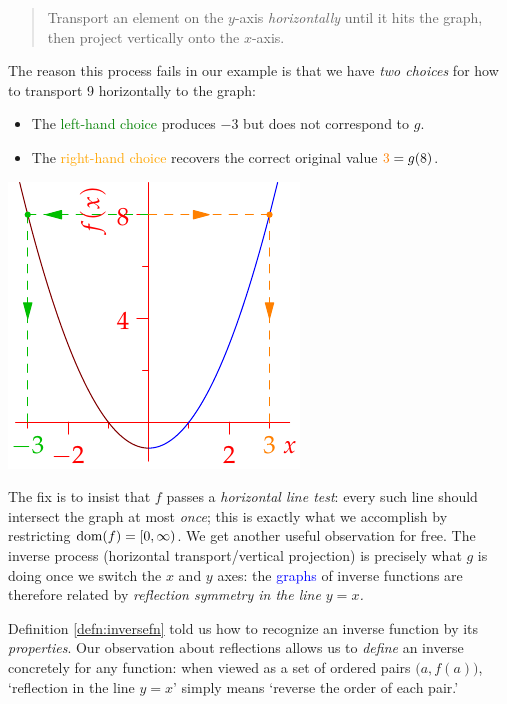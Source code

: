 \begin{minipage}[t]{0.72\linewidth}\vspace{-3pt}
\begin{quote}
Transport an element on the $y$-axis \emph{horizontally} until it hits the graph, then project vertically onto the $x$-axis.
\end{quote}
The reason this process fails in our example is that we have \emph{two choices} for how to transport 9 horizontally to the graph:
\begin{itemize}\itemsep2pt
  \item The \textcolor{Green}{left-hand choice} produces $-3$ but does not correspond to $g$.
  \item The \textcolor{orange}{right-hand choice} recovers the correct original value $\textcolor{orange}{3}=g(8)$.
\end{itemize}
\end{minipage}\hfill\begin{minipage}[t]{0.27\linewidth}\vspace{-8pt}
\flushright\includegraphics[scale=0.9]{inverses-poly1}
\end{minipage}\medbreak
The fix is to insist that $f$ passes a \emph{horizontal line test}: every such line should intersect the graph at most \emph{once}; this is exactly what we accomplish by restricting $\operatorname{dom}(f)=[0,\infty)$.\smallbreak
We get another useful observation for free. The inverse process (horizontal transport/vertical projection) is precisely what $g$ is doing once we switch the $x$ and $y$ axes: the \textcolor{blue}{graphs} of inverse functions are therefore related by \emph{reflection symmetry in the line $y=x$.}\smallbreak

Definition \ref{defn:inversefn} told us how to recognize an inverse function by its \emph{properties}. Our observation about reflections allows us to \emph{define} an inverse concretely for any function: when viewed as a set of ordered pairs $\bigl(a,f(a)\bigr)$, `reflection in the line $y=x$' simply means `reverse the order of each pair.'

